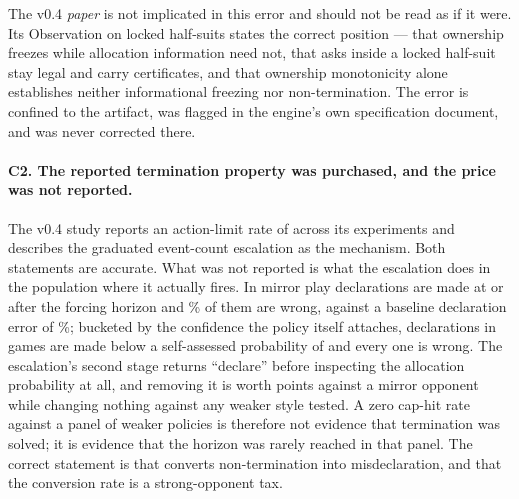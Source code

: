 The v0.4 \emph{paper} is not implicated in this error and should not be read as
if it were. Its Observation on locked half-suits states the correct position ---
that ownership freezes while allocation information need not, that asks inside a
locked half-suit stay legal and carry certificates, and that ownership
monotonicity alone establishes neither informational freezing nor
non-termination. The error is confined to the artifact, was flagged in the
engine's own specification document, and was never corrected there.

\paragraph{C2. The reported termination property was purchased, and the price was
not reported.} The v0.4 study reports an action-limit rate of \numVfourLimitRate{}
across its experiments and describes the graduated event-count escalation as the
mechanism. Both statements are accurate. What was not reported is what the
escalation does in the population where it actually fires. In mirror play
\numPostHorizonDecl{} declarations are made at or after the forcing horizon and
\numPostHorizonWrong\% of them are wrong, against a baseline declaration error of
\numDeclWrong\%; bucketed by the confidence the policy itself attaches,
\numLowConfDecl{} declarations in \numLowConfGames{} games are made below a
self-assessed probability of \numLowConfThresh{} and every one is wrong. The escalation's second stage returns ``declare'' before
inspecting the allocation probability at all, and removing it is worth
\numStageTwoCost{} points against a mirror opponent while changing nothing
against any weaker style tested. A zero cap-hit rate against a panel of weaker
policies is therefore not evidence that termination was solved; it is evidence
that the horizon was rarely reached in that panel. The correct statement is that
\vfour{} converts non-termination into misdeclaration, and that the conversion
rate is a strong-opponent tax.

